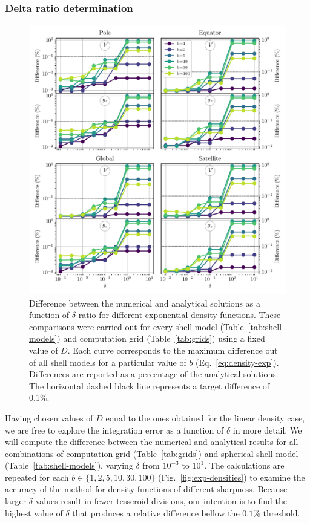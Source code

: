 \documentclass[extra, referee]{gji}
\begin{document}
\subsubsection{Delta ratio determination}

\begin{figure}
\centering
\includegraphics[width=\linewidth]{figures/exponential-density-diffs.pdf}
\caption{
    Difference between the numerical and analytical solutions as a function of $\delta$
    ratio for different exponential density functions.
    These comparisons were carried out for every shell model
    (Table~\ref{tab:shell-models}) and computation grid (Table~\ref{tab:grids})
    using a fixed value of $D$.
    Each curve corresponds to the maximum difference out of all shell models
    for a particular value of $b$ (Eq.~\ref{eq:density-exp}).
    Differences are reported as a percentage of the analytical solutions.
    The horizontal dashed black line represents a target difference of 0.1\%.
    }
\label{fig:delta-exponential}
\end{figure}

Having chosen values of $D$ equal to the ones obtained for the linear density case, we
are free to explore the integration error as a function of $\delta$ in more detail.
We will compute the difference between the numerical and analytical results for all
combinations of computation grid (Table~\ref{tab:grids}) and spherical shell model
(Table~\ref{tab:shell-models}), varying $\delta$ from $10^{-3}$ to $10^{1}$.
The calculations are repeated for each $b \in \{1, 2, 5, 10, 30, 100\}$
(Fig.~\ref{fig:exp-densities}) to examine the accuracy of the method for density
functions of different sharpness.
Because larger $\delta$ values result in fewer tesseroid divisions,
our intention is to find the highest value of $\delta$ that produces a relative
difference bellow the $0.1\%$ threshold.
\end{document}
